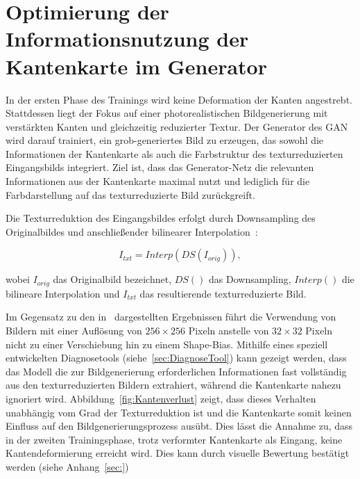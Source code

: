 \section{Optimierung der Informationsnutzung der Kantenkarte im Generator}
In der ersten Phase des Trainings wird keine Deformation der Kanten angestrebt. 
Stattdessen liegt der Fokus auf einer photorealistischen Bildgenerierung mit verstärkten Kanten und gleichzeitig reduzierter Textur. Der Generator des \ac{GAN} wird darauf trainiert, ein grob-generiertes Bild zu erzeugen, das sowohl die Informationen der Kantenkarte als auch die Farbstruktur des texturreduzierten Eingangsbilds integriert.
Ziel ist, dass das Generator-Netz die relevanten Informationen aus der Kantenkarte maximal nutzt und lediglich für die Farbdarstellung auf das texturreduzierte Bild zurückgreift.

\newpage

Die Texturreduktion des Eingangsbildes erfolgt durch Downsampling des Originalbildes und anschließender bilinearer Interpolation~\cite{He_2023_ICCV}:

\begin{equation}
    I_{txt} = Interp(DS(I_{orig})), 
\end{equation}

wobei $I_{orig}$ das Originalbild bezeichnet, $DS()$ das Downsampling, $Interp()$ die bilineare Interpolation und $I_{txt}$ das resultierende texturreduzierte Bild.

Im Gegensatz zu den in~\cite{He_2023_ICCV} dargestellten Ergebnissen führt die Verwendung von Bildern mit einer Auflösung von $256 \times 256$ Pixeln anstelle von $32 \times 32$ Pixeln nicht zu einer Verschiebung hin zu einem Shape-Bias.
Mithilfe eines speziell entwickelten Diagnosetools (siehe~\ref{sec:DiagnoseTool}) kann gezeigt werden, dass das Modell die zur Bildgenerierung erforderlichen Informationen fast vollständig aus den texturreduzierten Bildern extrahiert, während die Kantenkarte nahezu ignoriert wird.
Abbildung~\ref{fig:Kantenverlust} zeigt, dass dieses Verhalten unabhängig vom Grad der Texturreduktion ist und die Kantenkarte somit keinen Einfluss auf den Bildgenerierungsprozess ausübt.
Dies lässt die Annahme zu, dass in der zweiten Trainingsphase, trotz verformter Kantenkarte als Eingang, keine Kantendeformierung erreicht wird.
Dies kann durch visuelle Bewertung bestätigt werden (siehe Anhang~\ref{sec:})

